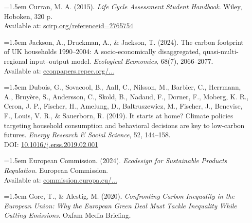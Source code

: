 \documentclass[12pt,a4paper]{article}%
\begin{document}
\vspace{0.5em}
{\small
\noindent
\parbox{\linewidth}{
\hangindent=1.5em
Curran, M. A. (2015). \textit{Life Cycle Assessment Student Handbook}. Wiley, Hoboken, 320 p. \\
Available at: \href{https://www.scirp.org/reference/referencespapers?referenceid=2765754}{scirp.org/referenceid=2765754}
}
}

\vspace{0.5em}
{\small
\noindent
\parbox{\linewidth}{
\hangindent=1.5em
Jackson, A., Druckman, A., \& Jackson, T. (2024). The carbon footprint of UK households 1990–2004: A socio-economically disaggregated, quasi-multi-regional input–output model. \textit{Ecological Economics}, 68(7), 2066–2077. \\
Available at: \href{https://econpapers.repec.org/article/eeeecolec/v_3a68_3ay_3a2009_3ai_3a7_3ap_3a2066-2077.htm}{econpapers.repec.org/...}
}
}

\vspace{0.5em}
{\small
\noindent
\parbox{\linewidth}{
\hangindent=1.5em
Dubois, G., Sovacool, B., Aall, C., Nilsson, M., Barbier, C., Herrmann, A., Bruyère, S., Andersson, C., Skold, B., Nadaud, F., Dorner, F., Moberg, K. R., Ceron, J. P., Fischer, H., Amelung, D., Baltruszewicz, M., Fischer, J., Benevise, F., Louis, V. R., \& Sauerborn, R. (2019). It starts at home? Climate policies targeting household consumption and behavioral decisions are key to low-carbon futures. \textit{Energy Research \& Social Science}, 52, 144–158. \\
DOI: \href{https://doi.org/10.1016/j.erss.2019.02.001}{10.1016/j.erss.2019.02.001}
}
}

\vspace{0.5em}
{\small
\noindent
\parbox{\linewidth}{
\hangindent=1.5em
European Commission. (2024). \textit{Ecodesign for Sustainable Products Regulation}. European Commission. \\
Available at: \href{https://commission.europa.eu/energy-climate-change-environment/standards-tools-and-labels/products-labelling-rules-and-requirements/ecodesign-sustainable-products-regulation_en}{commission.europa.eu/...}
}
}

\vspace{0.5em}
{\small
\noindent
\parbox{\linewidth}{
\hangindent=1.5em
Gore, T., \& Alestig, M. (2020). \textit{Confronting Carbon Inequality in the European Union: Why the European Green Deal Must Tackle Inequality While Cutting Emissions}. Oxfam Media Briefing.
}
}
\end{document}

